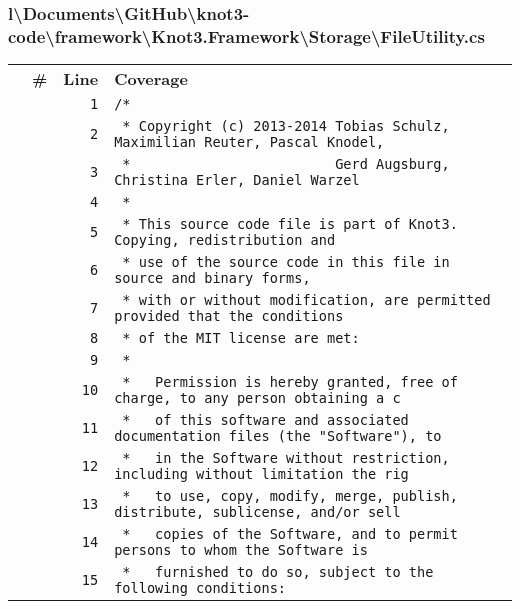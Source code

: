 \documentclass[a4paper,10pt]{article}
\begin{document}
\subsubsection{l\textbackslash Documents\textbackslash GitHub\textbackslash knot3-code\textbackslash framework\textbackslash Knot3.Framework\textbackslash Storage\textbackslash FileUtility.cs}
\begin{longtable}[l]{lrrl}
\textbf{} & \textbf{\#} & \textbf{Line} & \textbf{Coverage}\\
\cellcolor{gray} &  & \verb~1~ & \verb~/*~\\
\cellcolor{gray} &  & \verb~2~ & \verb~ * Copyright (c) 2013-2014 Tobias Schulz, Maximilian Reuter, Pascal Knodel,~\\
\cellcolor{gray} &  & \verb~3~ & \verb~ *                         Gerd Augsburg, Christina Erler, Daniel Warzel~\\
\cellcolor{gray} &  & \verb~4~ & \verb~ *~\\
\cellcolor{gray} &  & \verb~5~ & \verb~ * This source code file is part of Knot3. Copying, redistribution and~\\
\cellcolor{gray} &  & \verb~6~ & \verb~ * use of the source code in this file in source and binary forms,~\\
\cellcolor{gray} &  & \verb~7~ & \verb~ * with or without modification, are permitted provided that the conditions~\\
\cellcolor{gray} &  & \verb~8~ & \verb~ * of the MIT license are met:~\\
\cellcolor{gray} &  & \verb~9~ & \verb~ *~\\
\cellcolor{gray} &  & \verb~10~ & \verb~ *   Permission is hereby granted, free of charge, to any person obtaining a c~\\
\cellcolor{gray} &  & \verb~11~ & \verb~ *   of this software and associated documentation files (the "Software"), to ~\\
\cellcolor{gray} &  & \verb~12~ & \verb~ *   in the Software without restriction, including without limitation the rig~\\
\cellcolor{gray} &  & \verb~13~ & \verb~ *   to use, copy, modify, merge, publish, distribute, sublicense, and/or sell~\\
\cellcolor{gray} &  & \verb~14~ & \verb~ *   copies of the Software, and to permit persons to whom the Software is~\\
\cellcolor{gray} &  & \verb~15~ & \verb~ *   furnished to do so, subject to the following conditions:~\\

\end{longtable}
\end{document}
